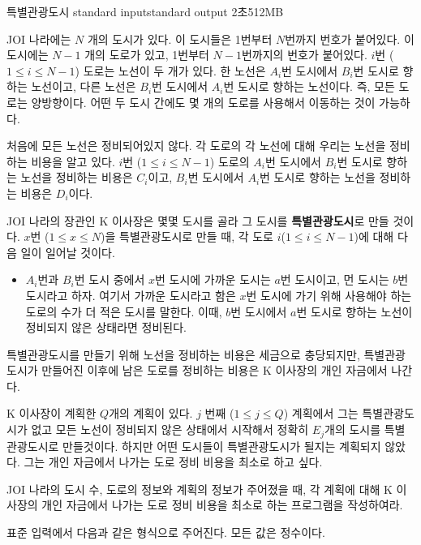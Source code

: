 \begin{problem}{특별관광도시}
	{standard input}{standard output}
	{2초}{512MB}{}
	
	JOI 나라에는 $N$ 개의 도시가 있다. 이 도시들은 1번부터 $N$번까지 번호가 붙어있다. 이 도시에는 $N-1$ 개의 도로가 있고, 1번부터 $N-1$번까지의 번호가 붙어있다. $i$번 ($1 \le i \le N-1$) 도로는 노선이 두 개가 있다. 한 노선은 $A_i$번 도시에서 $B_i$번 도시로 향하는 노선이고, 다른 노선은 $B_i$번 도시에서 $A_i$번 도시로 향하는 노선이다. 즉, 모든 도로는 양방향이다. 어떤 두 도시 간에도 몇 개의 도로를 사용해서 이동하는 것이 가능하다.
	
	처음에 모든 노선은 정비되어있지 않다. 각 도로의 각 노선에 대해 우리는 노선을 정비하는 비용을 알고 있다. $i$번 ($1 \le i \le N-1$) 도로의 $A_i$번 도시에서 $B_i$번 도시로 향하는 노선을 정비하는 비용은 $C_i$이고, $B_i$번 도시에서 $A_i$번 도시로 향하는 노선을 정비하는 비용은 $D_i$이다.
	
	JOI 나라의 장관인 K 이사장은 몇몇 도시를 골라 그 도시를 \textbf{특별관광도시}로 만들 것이다. $x$번 ($1 \le x \le N$)을 특별관광도시로 만들 때, 각 도로 $i$($1 \le i \le N-1$)에 대해 다음 일이 일어날 것이다.
	
	\begin{itemize}
		\item[] $A_i$번과 $B_i$번 도시 중에서 $x$번 도시에 가까운 도시는 $a$번 도시이고, 먼 도시는 $b$번 도시라고 하자. 여기서 가까운 도시라고 함은 $x$번 도시에 가기 위해 사용해야 하는 도로의 수가 더 적은 도시를 말한다. 이때, $b$번 도시에서 $a$번 도시로 향하는 노선이 정비되지 않은 상태라면 정비된다.
	\end{itemize}
	
	특별관광도시를 만들기 위해 노선을 정비하는 비용은 세금으로 충당되지만, 특별관광도시가 만들어진 이후에 남은 도로를 정비하는 비용은 K 이사장의 개인 자금에서 나간다.
	
	K 이사장이 계획한 $Q$개의 계획이 있다. $j$ 번째 ($1 \le j \le Q$) 계획에서 그는 특별관광도시가 없고 모든 노선이 정비되지 않은 상태에서 시작해서 정확히 $E_j$개의 도시를 특별관광도시로 만들것이다. 하지만 어떤 도시들이 특별관광도시가 될지는 계획되지 않았다. 그는 개인 자금에서 나가는 도로 정비 비용을 최소로 하고 싶다.
	
	JOI 나라의 도시 수, 도로의 정보와 계획의 정보가 주어졌을 때, 각 계획에 대해 K 이사장의 개인 자금에서 나가는 도로 정비 비용을 최소로 하는 프로그램을 작성하여라.
	
	\InputFile
	
	표준 입력에서 다음과 같은 형식으로 주어진다. 모든 값은 정수이다.


\end{problem}
